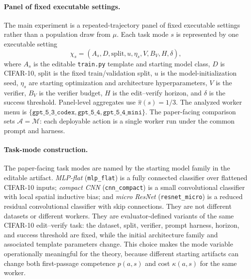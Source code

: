\documentclass{article}
\newcommand{\cA}{\mathcal{A}}
\newcommand{\cM}{\mathcal{M}}
\begin{document}
\paragraph{Panel of fixed executable settings.}
The main experiment is a repeated-trajectory panel of fixed executable settings rather than a population draw from \(\mu\).
Each task mode \(s\) is represented by one executable setting
\[
\chi_s=(A_s,D,\mathrm{split},u,\eta_s,V,B_V,H,\delta),
\]
where \(A_s\) is the editable \texttt{train.py} template and starting model class, \(D\) is CIFAR-10, \(\mathrm{split}\) is the fixed train/validation split, \(u\) is the model-initialization seed, \(\eta_s\) are starting optimization and architecture hyperparameters, \(V\) is the verifier, \(B_V\) is the verifier budget, \(H\) is the edit--verify horizon, and \(\delta\) is the success threshold.
Panel-level aggregates use \(\hat\pi(s)=1/3\).
The analyzed worker menu is \(\{\texttt{gpt\_5\_3\_codex},\texttt{gpt\_5\_4},\texttt{gpt\_5\_4\_mini}\}\).
The paper-facing comparison sets \(\cA=\cM\): each deployable action is a single worker run under the common prompt and harness.

\paragraph{Task-mode construction.}
The paper-facing task modes are named by the starting model family in the editable artifact.
\textit{MLP-flat} (\texttt{mlp\_flat}) is a fully connected classifier over flattened CIFAR-10 inputs; \textit{compact CNN} (\texttt{cnn\_compact}) is a small convolutional classifier with local spatial inductive bias; and \textit{micro ResNet} (\texttt{resnet\_micro}) is a reduced residual convolutional classifier with skip connections.
They are not different datasets or different workers.
They are evaluator-defined variants of the same CIFAR-10 edit--verify task: the dataset, split, verifier, prompt harness, horizon, and success threshold are fixed, while the initial architecture family and associated template parameters change.
This choice makes the mode variable operationally meaningful for the theory, because different starting artifacts can change both first-passage competence \(p(a,s)\) and cost \(\kappa(a,s)\) for the same worker.
\end{document}
